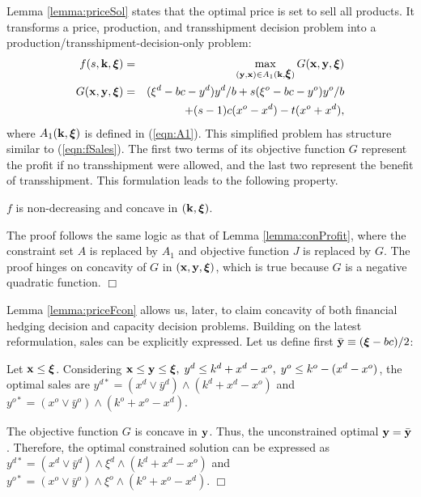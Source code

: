 \documentclass[mnsc,nonblindrev,copyedit]{informs2_wz} %
\newcommand{\proof}{\noindent{\bf Proof: } }
\newcommand{\qed}{ \hfill $\Box$ }
\newcommand{\OUT}[1]{}
\newcommand{\xiv}{\mbox{\boldmath$\xi$}}
\begin{document}
Lemma \ref{lemma:priceSol} states that the optimal price is set to sell all products.  It transforms a {price, production, and transshipment decision} problem into a production/transshipment-decision-only problem:
\begin{eqnarray}
f(s,\bold {k},\xiv) &=& \max_{(\bold{y,x}) \in A_1(\bold{k},\xiv)}
G(\bold{x,y},\xiv) \label{eqn:fPSales}\\
G(\bold{x,y},\xiv) &=& (\xi^d-bc-y^d)y^d/b + s(\xi^o-bc-y^o)y^o/b
\nonumber \\&& + (s-1)c(x^o -x^d) -t(x^o + x^d)
\label{eqn:GPrice},
\end{eqnarray}
where $A_1(\bold{k},\xiv)$ is defined in (\ref{eqn:A1}).  This simplified problem has structure similar to (\ref{eqn:fSales}).  The first two terms of its objective function $G$ represent the profit if no transshipment were allowed, and the last two represent the benefit of transshipment.  This formulation leads to the following property.


{\lemma $f$ is non-decreasing and concave in $(\bold k, \xiv)$. \label{lemma:priceFcon}}


\proof The proof follows the same logic as that of Lemma \ref{lemma:conProfit}, where the constraint set $A$ is replaced by $A_1$ and objective function $J$ is replaced by $G$.  The proof hinges on concavity of $G$ in $(\bold x, \bold y, \xiv)$, which is true because $G$ is a negative quadratic function. \qed \OUT{}

Lemma \ref{lemma:priceFcon} allows us, later, to claim concavity of both { financial hedging decision} and { capacity decision} problems.  Building on the latest reformulation, sales can be explicitly expressed.  Let us define first $\bar{\bold y} \equiv (\xiv-bc)/2$:


{\lemma Let $\bold x \leq \xiv$.  Considering $\bold x \leq \bold y \leq \xiv, \; y^d \leq k^d+x^d - x^o, \; y^o \leq k^o -(x^d - x^o)$, the optimal sales are $y^{d*} = (x^d\vee \bar{y}^d)\wedge (k^d +x^d-x^o)$ and $y^{o*} = (x^o\vee \bar{y}^o)\wedge( k^o+x^o-x^d)$. \label{lemma:solPSales}}

\proof The objective function $G$ is concave in $\bold y$.  Thus, the unconstrained optimal $\bold y = \bar{\bold y}$.  Therefore, the optimal constrained solution can be expressed as $y^{d*} = (x^d\vee \bar{y}^d)\wedge \xi^d \wedge (k^d+x^d-x^o)$ and $y^{o*} = (x^o\vee \bar{y}^o)\wedge \xi^o \wedge (k^o+x^o-x^d)$. \qed
\end{document}
